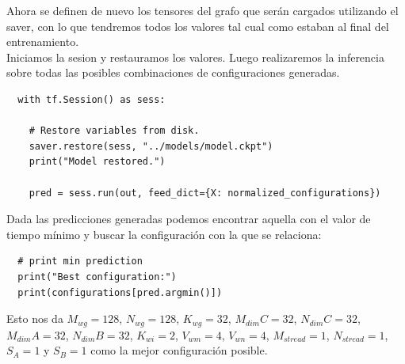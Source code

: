 \documentclass[osajnl,twocolumn,showpacs,superscriptaddress,10pt]{revtex4-1} %
\begin{document}
Ahora se definen de nuevo los tensores del grafo que serán cargados utilizando el saver, con lo que tendremos todos los valores tal cual como estaban al final del entrenamiento. \\

Iniciamos la sesion y restauramos los valores. Luego realizaremos la inferencia sobre todas las posibles combinaciones de configuraciones generadas.

\begin{verbatim}
  with tf.Session() as sess:

    # Restore variables from disk.
    saver.restore(sess, "../models/model.ckpt")
    print("Model restored.")

    pred = sess.run(out, feed_dict={X: normalized_configurations})
\end{verbatim}

Dada las predicciones generadas podemos encontrar aquella con el valor de tiempo mínimo y buscar la configuración con la que se relaciona:

\begin{verbatim}
  # print min prediction
  print("Best configuration:")
  print(configurations[pred.argmin()])
\end{verbatim}

Esto nos da $M_{wg} = 128$, $N_{wg} = 128$,  $K_{wg} = 32$,  $M_{dim}C = 32$, $N_{dim}C = 32$, $M_{dim}A = 32$, $ N_{dim}B = 32$, $K_{wi} = 2$, $V_{wm} = 4$, $V_{wn} = 4$, $M_{stread} = 1$, $N_{stread} = 1$, $S_A = 1$ y $S_B = 1$ como la mejor configuración posible.
\end{document}
